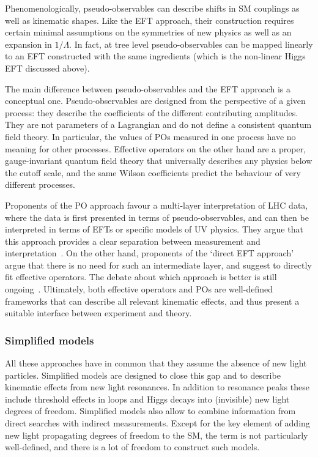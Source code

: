 Phenomenologically, pseudo-observables can describe shifts in SM
couplings as well as kinematic shapes. Like the EFT approach, their
construction requires certain minimal assumptions on the symmetries of
new physics as well as an expansion in $1/\Lambda$. In fact, at tree
level pseudo-observables can be mapped linearly to an EFT constructed
with the same ingredients (which is the non-linear Higgs EFT discussed
above).

The main difference between pseudo-observables and the EFT approach is
a conceptual one. Pseudo-observables are designed from the perspective
of a given process: they describe the coefficients of the different
contributing amplitudes. They are not parameters of a Lagrangian and
do not define a consistent quantum field theory. In particular, the
values of POs measured in one process have no meaning for other
processes. Effective operators on the other hand are a proper,
gauge-invariant quantum field theory that universally describes any
physics below the cutoff scale, and the same Wilson coefficients
predict the behaviour of very different processes.

Proponents of the PO approach favour a multi-layer interpretation of
LHC data, where the data is first presented in terms of
pseudo-observables, and can then be interpreted in terms of EFTs or
specific models of UV physics. They argue that this approach provides
a clear separation between measurement and
interpretation~\cite{deFlorian:2016spz}. On the other hand, proponents
of the `direct EFT approach' argue that there is no need for such an
intermediate layer, and suggest to directly fit effective
operators. The debate about which approach is better is still
ongoing~\cite{deFlorian:2016spz}. Ultimately, both effective operators
and POs are well-defined frameworks that can describe all relevant
kinematic effects, and thus present a suitable interface between
experiment and theory.



\subsubsection{Simplified models}

All these approaches have in common that they assume the absence of new
light particles. Simplified models are designed to close this gap and
to describe kinematic effects from new light resonances. In addition
to resonance peaks these include threshold effects in loops and Higgs
decays into (invisible) new light degrees of freedom. Simplified
models also allow to combine information from direct searches with
indirect measurements. Except for the key element of adding new light
propagating degrees of freedom to the SM, the term is not particularly
well-defined, and there is a lot of freedom to construct such models.


